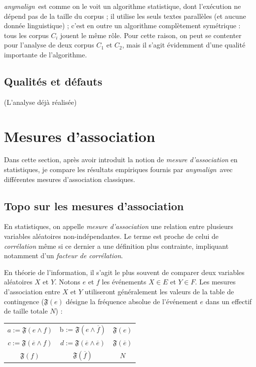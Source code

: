 \documentclass[a4paper,10pt]{article}
\newcommand{\anym}{\emph{anymalign}}
\begin{document}
\anym~est comme on le voit un algorithme statistique, dont l'exécution ne dépend pas de la taille du corpus ; il  utilise les seuls textes parallèles (et aucune donnée linguistique) ; c'est en outre un algorithme complètement symétrique : tous les corpus $C_i$ jouent le même rôle. Pour cette raison, on peut se contenter pour l'analyse de deux corpus $C_1$ et $C_2$, mais il s'agit évidemment d'une qualité importante de l'algorithme.


\subsection{Qualités et défauts}
(L'analyse déjà réalisée)


\section{Mesures d'association}

Dans cette section, après avoir introduit la notion de \emph{mesure d'association} en statistiques, je compare les résultats empiriques fournis par \anym~avec différentes mesures d'association classiques.

\subsection{Topo sur les mesures d'association}

En statistiques, on appelle \emph{mesure d'association} une relation entre plusieurs variables aléatoires non-indépendantes. Le terme est proche de celui de \emph{corrélation} même si ce dernier a une définition plus contrainte, impliquant notamment d'un \emph{facteur de corrélation}.

En théorie de l'information, il s'agit le plus souvent de comparer deux variables aléatoires $X$ et $Y$. Notons $e$ et $f$ les événements $X \in E$ et $Y \in F$. Les mesures d'association entre $X$ et $Y$ utiliseront généralement les valeurs de la table de contingence ($\mathfrak{F}(e)$ désigne la fréquence absolue de l'événement $e$ dans un effectif de taille totale $N$) :

\begin{tabular}{|cc|c|}
\hline
$a := \mathfrak{F}(e\wedge f)$ & b := $\mathfrak{F}(e\wedge\overline{f})$ & $\mathfrak{F}(e)$ \\
$c := \mathfrak{F}(\overline{e}\wedge f)$ & $d := \mathfrak{F}(\overline{e}\wedge\overline{e})$ & $\mathfrak{F}(\overline{e})$ \\
\hline
$\mathfrak{F}(f)$ & $\mathfrak{F}(\overline{f})$ & $N$ \\
\hline
\end{tabular}
\end{document}
